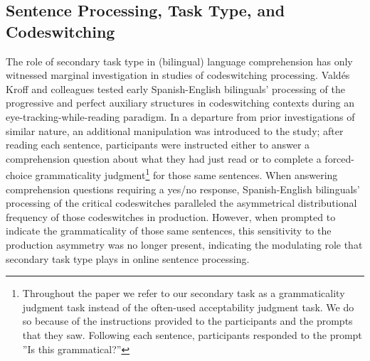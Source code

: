\documentclass[output=paper,colorlinks,citecolor=brown]{langscibook}
\begin{document}
\subsection{Sentence Processing, Task Type, and Codeswitching}
The role of secondary task type in (bilingual) language comprehension has only witnessed marginal investigation in studies of codeswitching processing. Vald\'es Kroff and colleagues \citeyear{ValdesKroffetal2018} tested early Spanish-English bilinguals’ processing of the progressive and perfect auxiliary structures in codeswitching contexts during an eye-tracking-while-reading paradigm. In a departure from prior investigations of similar nature, an additional manipulation was introduced to the study; after reading each sentence, participants were instructed either to answer a comprehension question about what they had just read or to complete a forced-choice grammaticality judgment\footnote{Throughout the paper we refer to our secondary task as a grammaticality judgment task instead of the often-used acceptability judgment task. We do so because of the instructions provided to the participants and the prompts that they saw. Following each sentence, participants responded to the prompt ''Is this grammatical?''} for those same sentences. When answering comprehension questions requiring a yes/no response, Spanish-English bilinguals’ processing of the critical codeswitches paralleled the asymmetrical distributional frequency of those codeswitches in production. However, when prompted to indicate the grammaticality of those same sentences, this sensitivity to the production asymmetry was no longer present, indicating the modulating role that secondary task type plays in online sentence processing.
\end{document}
